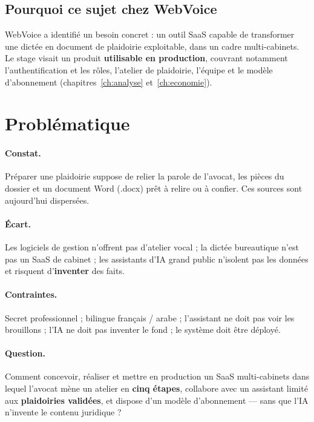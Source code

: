 \subsection{Pourquoi ce sujet chez WebVoice}

WebVoice a identifié un besoin concret : un outil SaaS capable de transformer une dictée en document de plaidoirie exploitable, dans un cadre multi-cabinets. Le stage visait un produit \textbf{utilisable en production}, couvrant notamment l'authentification et les rôles, l'atelier de plaidoirie, l'équipe et le modèle d'abonnement (chapitres~\ref{ch:analyse} et~\ref{ch:economie}).

\section{Problématique}
\label{sec:problematique}

\paragraph{Constat.}
Préparer une plaidoirie suppose de relier la parole de l'avocat, les pièces du dossier et un document Word (.docx) prêt à relire ou à confier. Ces sources sont aujourd'hui dispersées.

\paragraph{Écart.}
Les logiciels de gestion n'offrent pas d'atelier vocal ; la dictée bureautique n'est pas un SaaS de cabinet ; les assistants d'IA grand public n'isolent pas les données et risquent d'\textbf{inventer} des faits.

\paragraph{Contraintes.}
Secret professionnel ; bilingue français / arabe ; l'assistant ne doit pas voir les brouillons ; l'IA ne doit pas inventer le fond ; le système doit être déployé.

\paragraph{Question.}
Comment concevoir, réaliser et mettre en production un SaaS multi-cabinets dans lequel l'avocat mène un atelier en \textbf{cinq étapes}, collabore avec un assistant limité aux \textbf{plaidoiries validées}, et dispose d'un modèle d'abonnement --- sans que l'IA n'invente le contenu juridique ?

